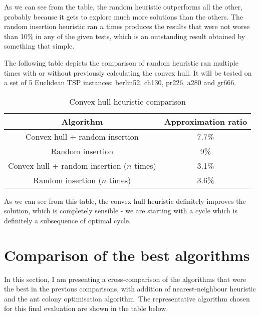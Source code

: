 \documentclass[12pt,twoside,notitlepage]{report}
\begin{document}
As we can see from the table, the random heuristic outperforms all the other, probably because it gets to explore much more solutions than the others. The random insertion heuristic ran $n$ times produces the results that were not worse than 10\% in any of the given tests, which is an outstanding result obtained by something that simple.

The following table depicts the  comparison of random heuristic ran multiple times with or without previously calculating the convex hull. It will be tested on a set of 5 Euclidean TSP instances: berlin52, ch130, pr226, a280 and gr666.

\begin{table}[h!]
\centering
\begin{tabular}{||c || c ||} 
 \hline
 Algorithm & Approximation ratio \\ [0.5ex] 
 \hline\hline
 Convex hull + random insertion &  7.7\% \\
 Random insertion & 9\% \\
 Convex hull + random insertion ($n$ times) &  3.1\% \\
 Random insertion ($n$ times) & 3.6\% \\
 \hline
\end{tabular}
\caption{Convex hull heuristic comparison}
\label{comparison:6}
\end{table}

As we can see from this table, the convex hull heuristic definitely improves the solution, which is completely sensible - we are starting with a cycle which is definitely a subsequence of optimal cycle.

\section{Comparison of the best algorithms}

In this section, I am presenting a cross-comparison of the algorithms that were the best in the previous comparisons, with addition of nearest-neighbour heuristic and the ant colony optimisation algorithm. The representative algorithm chosen for this final evaluation are shown in the table below.
\end{document}
